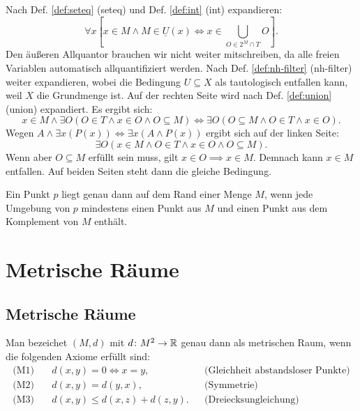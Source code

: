 \begin{Beweis}
Nach Def. \ref{def:seteq} (seteq) und Def. \ref{def:int} (int)
expandieren:%
\[\forall x[x\in M\land M\in\underline U(x)
\iff x\in\bigcup_{O\in 2^M\cap T} O].\]
Den äußeren Allquantor brauchen wir nicht weiter mitschreiben, da alle
freien Variablen automatisch allquantifiziert werden.
Nach Def. \ref{def:nh-filter} (nh-filter) weiter expandieren, wobei die
Bedingung $U\subseteq X$ als tautologisch entfallen kann,
weil $X$ die Grundmenge ist. Auf der rechten Seite wird nach Def.
\ref{def:union} (union) expandiert. Es ergibt sich:
\[x\in M\land \exists O(O\in T\land x\in O\land O\subseteq M)
\iff \exists O(O\subseteq M\land O\in T\land x\in O).\]
Wegen $A\land\exists x(P(x))\iff \exists x(A\land P(x))$ ergibt
sich auf der linken Seite:
\[\exists O(x\in M\land O\in T\land x\in O\land O\subseteq M).\]
Wenn aber $O\subseteq M$ erfüllt sein muss, gilt
$x\in O\implies x\in M$. Demnach kann $x\in M$ entfallen.
Auf beiden Seiten steht dann die gleiche Bedingung.\,\qedsymbol
\end{Beweis}

\begin{Satz}\label{boundary-point-char}
Ein Punkt $p$ liegt genau dann auf dem Rand einer Menge $M$, wenn
jede Umgebung von $p$ mindestens einen Punkt aus $M$ und
einen Punkt aus dem Komplement von $M$ enthält.
\end{Satz}

\newpage
\section{Metrische Räume}
\subsection{Metrische Räume}
\begin{Definition}%
\label{metric-space}
Man bezeichet $(M,d)$ mit $d\colon M^2\to\mathbb R$ genau dann als
metrischen Raum, wenn die folgenden Axiome erfüllt sind:
\begin{align*}
\text{(M1)}\quad & d(x,y)=0\iff x=y, &&\text{(Gleichheit abstandsloser Punkte)}\\
\text{(M2)}\quad & d(x,y)=d(y,x), &&\text{(Symmetrie)}\\
\text{(M3)}\quad & d(x,y)\le d(x,z)+d(z,y). &&\text{(Dreiecksungleichung)}
\end{align*}
\end{Definition}

